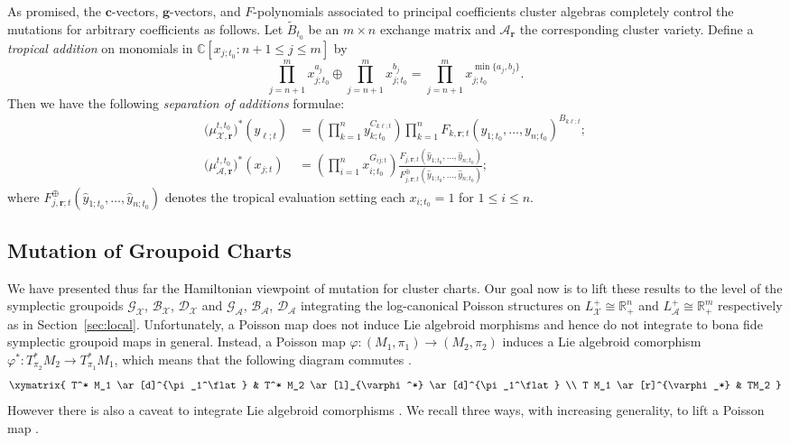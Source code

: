 \documentclass{amsart}
\numberwithin{equation}{section}
\newcommand{\bfc}{\mathbf{c}}
\newcommand{\bfg}{\mathbf{g}}
\newcommand{\bfr}{{\boldsymbol{r}}}
\newcommand{\cA}{\mathcal{A}}
\newcommand{\cB}{\mathcal{B}}
\newcommand{\cD}{\mathcal{D}}
\newcommand{\cG}{\mathcal{G}}
\newcommand{\cX}{\mathcal{X}}
\newcommand{\CC}{\mathbb{C}}
\newcommand{\RR}{\mathbb{R}}
\begin{document}
As promised, the $\bfc$-vectors, $\bfg$-vectors, and $F$-polynomials associated to principal coefficients cluster algebras completely control the mutations for arbitrary coefficients as follows.
Let $\tilde B_{t_0}$ be an $m\times n$ exchange matrix and $\cA_\bfr$ the corresponding cluster variety.
Define a \emph{tropical addition} on monomials in $\CC[x_{j;t_0}:n+1\le j\le m]$ by
\[\prod_{j=n+1}^m x_{j;t_0}^{a_j}\oplus \prod_{j=n+1}^m x_{j;t_0}^{b_j}=\prod_{j=n+1}^m x_{j;t_0}^{\min\{a_j,b_j\}}.\]
Then we have the following \emph{separation of additions} formulae:
\begin{align}
  \label{eq:separation of additions 1}
  \big(\mu_{\cX,\bfr}^{t,t_0}\big)^*(y_{\ell;t})&=\left(\prod_{k=1}^n y_{k;t_0}^{C_{k \ell;t}}\right) \prod_{k=1}^n F_{k,\bfr;t}(y_{1;t_0},\ldots,y_{n;t_0})^{B_{k \ell;t}};\\
  \label{eq:separation of additions 2}
  \big(\mu_{\cA,\bfr}^{t,t_0}\big)^*(x_{j;t})&=\left(\prod_{i=1}^n x_{i;t_0}^{G_{ij;t}}\right) \frac{F_{j,\bfr;t}(\hat y_{1;t_0},\ldots,\hat y_{n;t_0})}{F_{j,\bfr;t}^{\oplus}(\hat y_{1;t_0},\ldots,\hat y_{n;t_0})};
\end{align}
where $F_{j,\bfr;t}^{\oplus}(\hat y_{1;t_0},\ldots,\hat y_{n;t_0})$ denotes the tropical evaluation setting each $x_{i;t_0}=1$ for $1\le i \le n$.


\subsection{Mutation of Groupoid Charts}
\label{sec:groupoid mutations}

We have presented thus far the Hamiltonian viewpoint of mutation for cluster charts. Our goal now is to lift these results to the level of the symplectic groupoids $\cG_\cX$, $\cB_\cX$, $\cD_\cX$ and $\cG_\cA$, $\cB_\cA$, $\cD_\cA$ integrating the log-canonical Poisson structures on $L^+_\cX\cong\RR_+^n$ and $L^+_\cA\cong\RR_+^m$ respectively as in Section~\ref{sec:local}. Unfortunately,
 a Poisson map does not induce Lie algebroid morphisms and hence do not integrate to bona fide symplectic groupoid maps in general. Instead, a Poisson map $\varphi: (M_1, \pi_1) \to (M_2, \pi_2)$ induces a Lie algebroid comorphism $\varphi^*: T^*_{\pi_2} M_2 \to T^*_{\pi_1} M_1$, which means that the following diagram commutes \cite{MR1037400}.
\begin{equation} 
	\xymatrix{
		T^* M_1 \ar[d]^{\pi_1^\flat} & T^* M_2 \ar[l]_{\varphi^*} \ar[d]^{\pi_1^\flat} \\
		T M_1 \ar[r]^{\varphi_*} & TM_2
	}
\end{equation}
However there is also a caveat to integrate Lie algebroid comorphisms \cite{MR3089758}. We recall three ways, with increasing generality, to lift a Poisson map .
\end{document}

